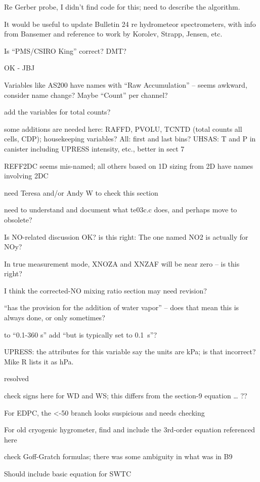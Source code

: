 \documentclass[
  english,
]{book}
\begin{document}
Re Gerber probe, I didn't find code for this; need to describe the algorithm.

It would be useful to update Bulletin 24 re hydrometeor spectrometers, with info from Bansemer and reference to work by Korolev, Strapp, Jensen, etc.

Is ``PMS/CSIRO King'' correct? DMT?

OK - JBJ

Variables like AS200 have names with ``Raw Accumulation'' -- seems awkward, consider name change? Maybe ``Count'' per channel?

add the variables for total counts?

some additions are needed here: RAFFD, PVOLU, TCNTD (total counts all cells, CDP); housekeeping variables? All: first and last bins? UHSAS: T and P in canister including UPRESS intensity, etc., better in sect 7

REFF2DC seems mis-named; all others based on 1D sizing from 2D have names involving 2DC

need Teresa and/or Andy W to check this section

need to understand and document what te03c.c does, and perhaps move to obsolete?

Is NO-related discussion OK? is this right: The one named NO2 is actually for NOy?

In true measurement mode, XNOZA and XNZAF will be near zero -- is this right?

I think the corrected-NO mixing ratio section may need revision?

``has the provision for the addition of water vapor'' -- does that mean this is always done, or only sometimes?

to ``0.1-360 s'' add ``but is typically set to 0.1~s''?

UPRESS: the attributes for this variable say the units are kPa; is that incorrect? Mike R lists it as hPa.

resolved

check signs here for WD and WS; this differs from the section-9 equation \ldots{} ??

For EDPC, the \textless-50 branch looks suspicious and needs checking

For old cryogenic hygrometer, find and include the 3rd-order equation referenced here

check Goff-Gratch formulas; there was some ambiguity in what was in B9

Should include basic equation for SWTC
\end{document}
